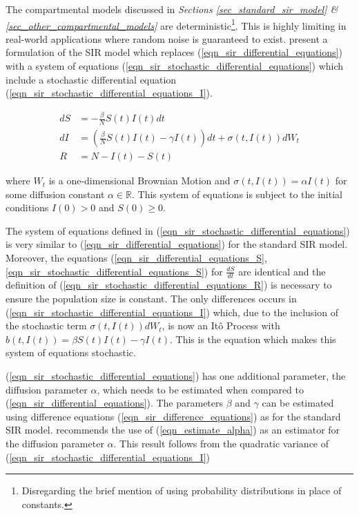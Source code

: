\documentclass[11pt,a4paper]{article}
\theoremstyle{break}
\begin{document}
  \par The compartmental models discussed in \textit{Sections \ref{sec_standard_sir_model} \& \ref{sec_other_compartmental_models}} are deterministic\footnote{Disregarding the brief mention of using probability distributions in place of constants.}. This is highly limiting in real-world applications where random noise is guaranteed to exist. \cite[]{infectious_disease_spread_analysis_using_sdes} present a formulation of the SIR model which replaces (\ref{eqn_sir_differential_equations}) with a system of equations (\ref{eqn_sir_stochastic_differential_equations}) which include a stochastic differential equation (\ref{eqn_sir_stochastic_differential_equations_I}).

  \begin{subequations}\label{eqn_sir_stochastic_differential_equations}
    \begin{alignat}{2}
      dS&=-\frac\beta{N} S(t)I(t)dt\label{eqn_sir_stochastic_differential_equations_S}\\
      dI&=\left(\frac\beta{N} S(t)I(t)-\gamma I(t)\right)dt+\sigma(t,I(t))dW_t\label{eqn_sir_stochastic_differential_equations_I}\\
      R&=N-I(t)-S(t)\label{eqn_sir_stochastic_differential_equations_R}
    \end{alignat}
  \end{subequations}

  \noindent where $W_t$ is a one-dimensional Brownian Motion and $\sigma(t,I(t))=\alpha I(t)$ for some diffusion constant $\alpha\in\mathbb{R}$. This system of equations is subject to the initial conditions $I(0)>0$ and $S(0)\geq0$.

  \par The system of equations defined in (\ref{eqn_sir_stochastic_differential_equations}) is very similar to (\ref{eqn_sir_differential_equations}) for the standard SIR model. Moreover, the equations (\ref{eqn_sir_differential_equations_S},\ref{eqn_sir_stochastic_differential_equations_S}) for $\frac{dS}{dt}$ are identical and the definition of (\ref{eqn_sir_stochastic_differential_equations_R}) is necessary to ensure the population size is constant. The only differences occurs in (\ref{eqn_sir_stochastic_differential_equations_I}) which, due to the inclusion of the stochastic term ${\sigma(t,I(t))dW_t}$, is now an It\^o Process with ${b(t,I(t))=\beta S(t)I(t)-\gamma I(t)}$. This is the equation which makes this system of equations stochastic.

  \par (\ref{eqn_sir_stochastic_differential_equations}) has one additional parameter, the diffusion parameter $\alpha$, which needs to be estimated when compared to (\ref{eqn_sir_differential_equations}). The parameters $\beta$ and $\gamma$ can be estimated using difference equations (\ref{eqn_sir_difference_equations}) as for the standard SIR model. \cite[]{infectious_disease_spread_analysis_using_sdes} recommends the use of (\ref{eqn_estimate_alpha}) as an estimator for the diffusion parameter $\alpha$. This result follows from the quadratic variance of (\ref{eqn_sir_stochastic_differential_equations_I})
\end{document}
